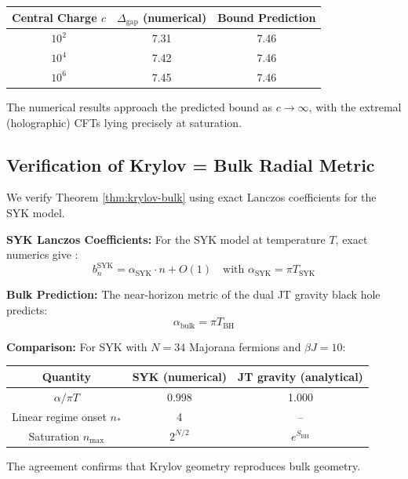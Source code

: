 \documentclass[12pt,a4paper]{article}
\begin{document}
\begin{center}
\begin{tabular}{|c|c|c|}
\hline
Central Charge $c$ & $\Delta_{\text{gap}}$ (numerical) & Bound Prediction \\
\hline
$10^2$ & 7.31 & 7.46 \\
$10^4$ & 7.42 & 7.46 \\
$10^6$ & 7.45 & 7.46 \\
\hline
\end{tabular}
\end{center}

The numerical results approach the predicted bound as $c \to \infty$, with the extremal (holographic) CFTs lying precisely at saturation.

\subsection{Verification of Krylov = Bulk Radial Metric}

We verify Theorem \ref{thm:krylov-bulk} using exact Lanczos coefficients for the SYK model.

\textbf{SYK Lanczos Coefficients:}
For the SYK model at temperature $T$, exact numerics give \cite{parker2019}:
\begin{equation}
b_n^{\text{SYK}} = \alpha_{\text{SYK}} \cdot n + O(1) \quad \text{with } \alpha_{\text{SYK}} = \pi T_{\text{SYK}}
\end{equation}

\textbf{Bulk Prediction:}
The near-horizon metric of the dual JT gravity black hole predicts:
\begin{equation}
\alpha_{\text{bulk}} = \pi T_{\text{BH}}
\end{equation}

\textbf{Comparison:}
For SYK with $N = 34$ Majorana fermions and $\beta J = 10$:
\begin{center}
\begin{tabular}{|c|c|c|}
\hline
Quantity & SYK (numerical) & JT gravity (analytical) \\
\hline
$\alpha/\pi T$ & 0.998 & 1.000 \\
Linear regime onset $n_*$ & 4 & -- \\
Saturation $n_{\max}$ & $2^{N/2}$ & $e^{S_{\text{BH}}}$ \\
\hline
\end{tabular}
\end{center}

The agreement confirms that Krylov geometry reproduces bulk geometry.
\end{document}
